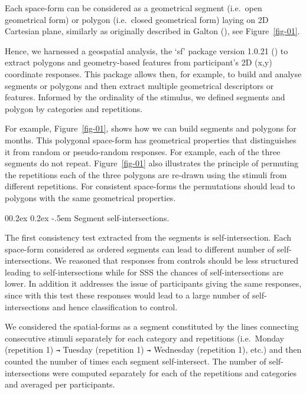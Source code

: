 \documentclass[
  man,
  floatsintext,
  longtable,
  a4paper,
  nolmodern,
  notxfonts,
  notimes,
  colorlinks=true,linkcolor=blue,citecolor=blue,urlcolor=blue]{apa7}
\makeatletter
\renewcommand{\paragraph}{\@startsection{paragraph}{4}{\parindent}%
	{0\baselineskip \@plus 0.2ex \@minus 0.2ex}%
	{-.5em}%
	{\normalfont\normalsize\bfseries\typesectitle}}
\makeatother
\begin{document}
Each space-form can be considered as a geometrical segment (i.e.~open
geometrical form) or polygon (i.e.~closed geometrical form) laying on 2D
Cartesian plane, similarly as originally described in Galton
(), see Figure~\ref{fig-01}.

Hence, we harnessed a geospatial analysis, the `sf' package version
1.0.21 () to extract polygons
and geometry-based features from participant's 2D (x,y) coordinate
responses. This package allows then, for example, to build and analyse
segments or polygons and then extract multiple geometrical descriptors
or features. Informed by the ordinality of the stimulus, we defined
segments and polygon by categories and repetitions.

For example, Figure~\ref{fig-01}, shows how we can build segments and
polygons for months. This polygonal space-form has geometrical
properties that distinguishes it from random or pseudo-random responses.
For example, each of the three segments do not repeat.
Figure~\ref{fig-01} also illustrates the principle of permuting the
repetitions each of the three polygons are re-drawn using the stimuli
from different repetitions. For consistent space-forms the permutations
should lead to polygons with the same geometrical properties.

\paragraph{Segment
self-intersections.}\label{segment-self-intersections}

The first consistency test extracted from the segments is
self-intersection. Each space-form considered as ordered segments can
lead to different number of self-intersections. We reasoned that
responses from controls should be less structured leading to
self-intersections while for SSS the chances of self-intersections are
lower. In addition it addresses the issue of participants giving the
same responses, since with this test these responses would lead to a
large number of self-intersections and hence classification to control.

We considered the spatial-forms as a segment constituted by the lines
connecting consecutive stimuli separately for each category and
repetitions (i.e.~Monday (repetition 1) \texttt{→} Tuesday (repetition
1) \texttt{→} Wednesday (repetition 1), etc.) and then counted the
number of times each segment self-intersect. The number of
self-intersections were computed separately for each of the repetitions
and categories and averaged per participants.
\end{document}
